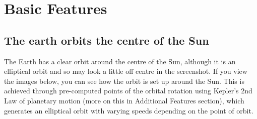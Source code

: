 \documentclass[12pt]{article}
\begin{document}

\section{Basic Features}
\subsection{The earth orbits the centre of the Sun}
The Earth has a clear orbit around the centre of the Sun, although it is an elliptical orbit and so may look a little off centre in the screenshot. If you view the images below, you can see how the orbit is set up around the Sun. This is achieved through pre-computed points of the orbital rotation using Kepler's 2nd Law of planetary motion (more on this in Additional Features section), which generates an elliptical orbit with varying speeds depending on the point of orbit.
\end{document}
